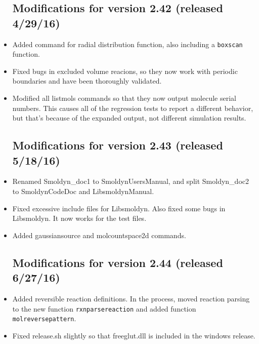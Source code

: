 \documentclass {scrbook}
\newcommand {\ttt} {\texttt}
\begin{document}
\begin{itemize}
\subsection{Modifications for version 2.42 (released 4/29/16)}
\item Added command for radial distribution function, also including a \ttt{boxscan} function.
\item Fixed bugs in excluded volume reacions, so they now work with periodic boundaries and have been thoroughly validated.
\item Modified all listmols commands so that they now output molecule serial numbers. This causes all of the regression tests to report a different behavior, but that's because of the expanded output, not different simulation results.

\subsection{Modifications for version 2.43 (released 5/18/16)}
\item Renamed Smoldyn\_doc1 to SmoldynUsersManual, and split Smoldyn\_doc2 to SmoldynCodeDoc and LibsmoldynManual.
\item Fixed excessive include files for Libsmoldyn. Also fixed some bugs in Libsmoldyn. It now works for the test files.
\item Added gaussiansource and molcountspace2d commands.

\subsection{Modifications for version 2.44 (released 6/27/16)}
\item Added reversible reaction definitions. In the process, moved reaction parsing to the new function \ttt{rxnparsereaction} and added function \ttt{molreversepattern}.
\item Fixed release.sh slightly so that freeglut.dll is included in the windows release.


\end{itemize}
\end{document}
